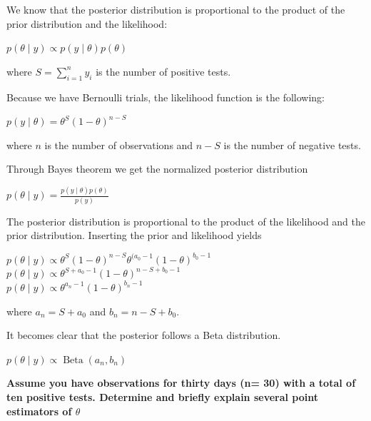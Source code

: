 \documentclass{article}
\begin{document}
\par 
We know that the posterior distribution is proportional to the product of the prior distribution and the likelihood:
\begin{center}
$p(\theta \mid y) \propto p(y \mid \theta) p(\theta)$
\end{center}

where $S=\sum_{i=1}^{n}y_{i}$ is the number of positive tests.

Because we have Bernoulli trials, the likelihood function is the following: \par 
\begin{center}
    $p(y \mid \theta) = \theta^S (1 - \theta)^{n-S}$
\end{center}

where $n$ is the number of observations and $n-S$ is the number of negative tests.

Through Bayes theorem we get the normalized posterior distribution \par 
\begin{center}
    $p(\theta \mid y) = \frac{p(y \mid \theta) p(\theta)}{p(y)}$
    \end{center}
The posterior distribution is proportional to the product of the likelihood and the prior distribution. Inserting the prior and likelihood yields \par 
\begin{center}
    $p(\theta \mid y) \propto \theta^S (1 - \theta)^{n-S} \theta^{(a_{0}-1} (1 - \theta)^{b_{0}-1}$ \\
    $p(\theta \mid y) \propto \theta^{S+a_{0}-1} (1 - \theta)^{n-S+b_{0}-1}$ \\
    $p(\theta \mid y) \propto \theta^{a_{n}-1} (1 - \theta)^{b_{n}-1}$

\end{center}

where $a_{n}=S+a_{0}$ and $b_{n}=n-S+b_{0}$.

It becomes clear that the posterior follows a Beta distribution. \par 
\begin{center}
    $p(\theta \mid y) \propto \operatorname{Beta}(a_{n}, b_{n})$ \par
    
\newpage

\end{center}
\begin{center}
 \textbf{Assume you have observations for thirty days (n= 30) with a total of ten positive tests. Determine and briefly explain several point estimators of $\theta$ }
\end{center}
\end{document}

